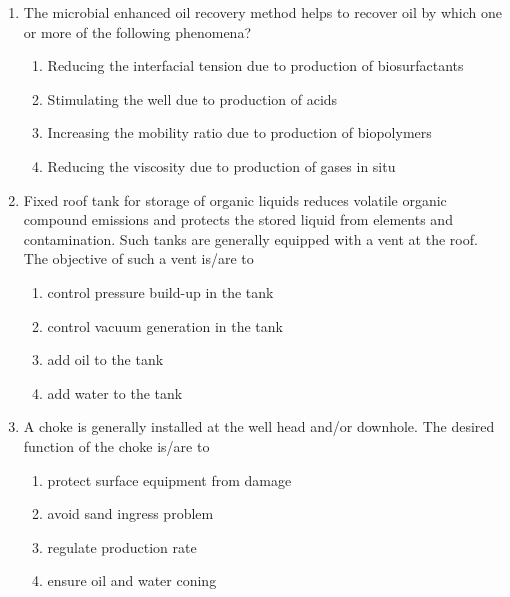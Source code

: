 \documentclass[journal,12pt,onecolumn]{IEEEtran}
\theoremstyle{remark}
\begin{document}
\begin{enumerate}
\begin{enumerate}
\end{enumerate}
\hfill{}
 \item The microbial enhanced oil recovery method helps to recover oil by which one or more of the following phenomena?
\begin{enumerate}
    \item Reducing the interfacial tension due to production of biosurfactants
    \item Stimulating the well due to production of acids
    \item Increasing the mobility ratio due to production of biopolymers
    \item Reducing the viscosity due to production of gases in situ
\end{enumerate}
\hfill{}




\item  Fixed roof tank for storage of organic liquids reduces volatile organic compound  emissions and protects the stored liquid from elements and contamination. Such tanks are generally equipped with a vent at the roof. The objective of such a vent is/are to
\begin{enumerate}
    \item control pressure build-up in the tank
    \item control vacuum generation in the tank
    \item add oil to the tank
    \item add water to the tank
\end{enumerate}
\hfill{}



\item  A choke is generally installed at the well head and/or downhole. The desired function of the choke is/are to
\begin{enumerate}
    \item protect surface equipment from damage
    \item avoid sand ingress problem
    \item regulate production rate
    \item ensure oil and water coning
\end{enumerate}
\hfill{}




\end{enumerate}
\end{document}
